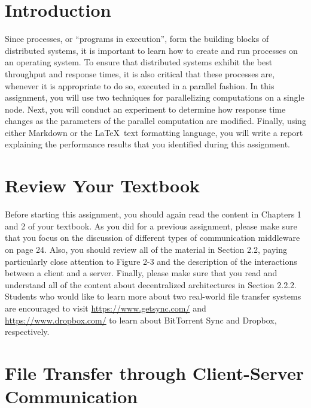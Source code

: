 


\usepackage[compact]{titlesec}



\section*{Introduction}

Since processes, or ``programs in execution'', form the building blocks of distributed systems, it is important to learn
how to create and run processes on an operating system. To ensure that distributed systems exhibit the best throughput
and response times, it is also critical that these processes are, whenever it is appropriate to do so, executed in a
parallel fashion. In this assignment, you will use two techniques for parallelizing computations on a single node. Next,
you will conduct an experiment to determine how response time changes as the parameters of the parallel computation are
modified.  Finally, using either Markdown or the \LaTeX~text formatting language, you will write a report explaining the
performance results that you identified during this assignment.

\section*{Review Your Textbook}

Before starting this assignment, you should again read the content in Chapters 1 and 2 of your textbook. As
you did for a previous assignment, please make sure that you focus on the discussion of different types of communication
middleware on page 24. Also, you should review all of the material in Section 2.2, paying particularly close attention
to Figure 2-3 and the description of the interactions between a client and a server. Finally, please make sure that you
read and understand all of the content about decentralized architectures in Section 2.2.2. Students who would like to
learn more about two real-world file transfer systems are encouraged to visit \url{https://www.getsync.com/} and
\url{https://www.dropbox.com/} to learn about BitTorrent Sync and Dropbox, respectively.

\section*{File Transfer through Client-Server Communication}

